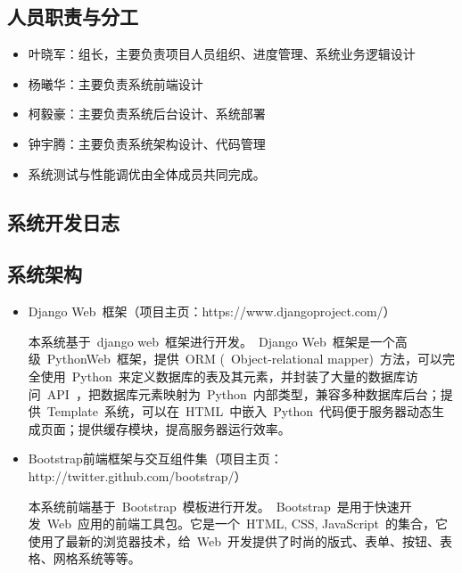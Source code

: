 \appendix
\begin{center}
  \section{人员职责与分工}
\end{center}

\begin{itemize}
  \item 叶晓军：组长，主要负责项目人员组织、进度管理、系统业务逻辑设计
  \item 杨曦华：主要负责系统前端设计
  \item 柯毅豪：主要负责系统后台设计、系统部署
  \item 钟宇腾：主要负责系统架构设计、代码管理
  \item 系统测试与性能调优由全体成员共同完成。
\end{itemize}


\newpage

\begin{center}
  \section{系统开发日志}
\end{center}
\subsection{系统架构}
\begin{itemize}
  \item Django Web~框架（项目主页：https://www.djangoproject.com/）
  
  \CJKindent 本系统基于~django web~框架进行开发。~Django Web~框架是一个高级~Python\footnotemark[1] Web~框架，提供~ORM (~Object-relational mapper)~方法，可以完全使用~Python~来定义数据库的表及其元素，并封装了大量的数据库访问~API~，把数据库元素映射为~Python~内部类型，兼容多种数据库后台；提供~Template~系统，可以在~HTML~中嵌入~Python~代码便于服务器动态生成页面；提供缓存模块，提高服务器运行效率。
  
  \item Bootstrap前端框架与交互组件集（项目主页：http://twitter.github.com/bootstrap/）
  
  \CJKindent 本系统前端基于~Bootstrap~模板进行开发。~Bootstrap~是用于快速开发~Web~应用的前端工具包。它是一个~HTML, CSS, JavaScript~的集合，它使用了最新的浏览器技术，给~Web~开发提供了时尚的版式、表单、按钮、表格、网格系统等等。
\end{itemize}

